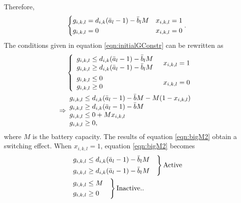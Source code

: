 Therefore, 
\begin{equation}\label{eqn:initialGConstr}
	\begin{aligned}
		\begin{dcases}
			g_{i,k,l} = d_{i,k}(\bar{a}_l - 1) - \bar{b}_lM & x_{i,k,l} = 1\\
			g_{i,k,l} = 0 & x_{i,k,l} = 0
		\end{dcases}.
	\end{aligned}
\end{equation}
The conditions given in equation \ref{eqn:initialGConstr} can be rewritten as 
\begin{equation}\label{eqn:bigM2}
\begin{aligned}
	& \begin{dcases} 
		\begin{array}{l}
		g_{i,k,l} \le d_{i,k}(\bar{a}_l - 1) - \bar{b}_lM\\
		g_{i,k,l} \ge d_{i,k}(\bar{a}_l - 1) - \bar{b}_lM\\
		\end{array}
		& x_{i,k,l} = 1 \\
		\begin{array}{l}
		g_{i,k,l} \le 0 \\
		g_{i,k,l} \ge 0 \\
		\end{array} & x_{i,k,l} = 0\\ 
	\end{dcases} \\ 
	\Rightarrow &  
	\begin{array}{l} 
		 g_{i,k,l} \le d_{i,k}(\bar{a}_l - 1) - \bar{b}M - M(1 - x_{i,k,l})\\
		 g_{i,k,l} \ge d_{i,k}(\bar{a}_l - 1) - \bar{b}M\\
		 g_{i,k,l} \le 0 + Mx_{i,k,l} \\
		 g_{i,k,l} \ge 0, \\
	\end{array}\\ 
\end{aligned}
\end{equation}
where $M$ is the battery capacity. The results of equation \eqref{eqn:bigM2} obtain a switching effect.  When $x_{i,k,l} = 1$, equation \ref{eqn:bigM2} becomes 
\begin{equation}
	\begin{aligned}
		& \begin{rcases}
			g_{i,k,l} \le d_{i,k}(\bar{a}_l - 1) - \bar{b}_lM & \\
			g_{i,k,l} \ge d_{i,k}(\bar{a}_l - 1) - \bar{b}_lM & \\
		\end{rcases} \text{Active}\\ 
		& \begin{drcases}
			g_{i,k,l} \le M & \\
			g_{i,k,l} \ge 0 & \\ 
		\end{drcases} \text{Inactive}.. \\
	\end{aligned}
\end{equation}
